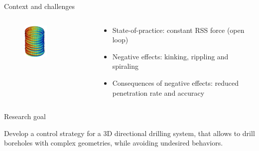 \documentclass[10pt]{beamer}
\begin{document}
\begin{frame}{Context and challenges}
		\begin{columns}[T]	\begin{column}{0.5\textwidth}\setlength{\leftmargini}{0pt}
				\vspace{1cm}
				\begin{figure}[ht]\centering
					\includegraphics[width=0.5\textwidth]{images/Spiraling.png}
				\end{figure}
			\centering	[Sugiura 2009]
			\end{column}
			\begin{column}{0.6\textwidth}\setlength{\leftmargini}{0pt}
				\begin{itemize}
					\setlength\itemsep{3em}
					\item State-of-practice: constant RSS force (open loop)
					\item Negative effects: kinking, rippling and spiraling
					\item Consequences of negative effects: reduced penetration rate and accuracy
				\end{itemize}			
			\end{column}
		\end{columns}
\end{frame}

\begin{frame}{Research goal}
	\begin{block}{}\Large Develop a control strategy for a 3D directional drilling system, that allows to drill boreholes with complex geometries, while avoiding undesired behaviors.
	\end{block}
\end{frame}
\end{document}
